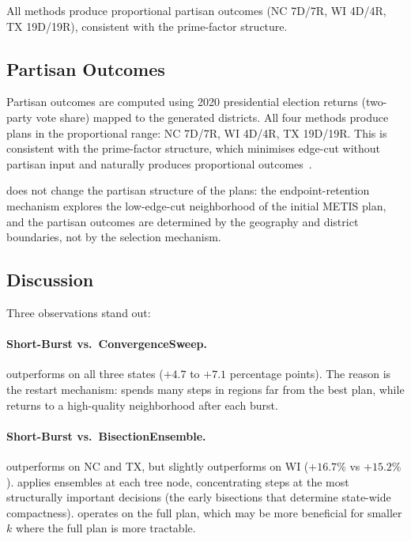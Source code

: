 \noindent All methods produce proportional partisan outcomes (NC 7D/7R,
WI 4D/4R, TX 19D/19R), consistent with the \ar{} prime-factor structure.

\subsection{Partisan Outcomes}

Partisan outcomes are computed using 2020 presidential election returns
(two-party vote share) mapped to the generated districts.
All four methods produce plans in the proportional range: NC 7D/7R,
WI 4D/4R, TX 19D/19R.
This is consistent with the \ar{} prime-factor structure, which
minimises edge-cut without partisan input and naturally produces
proportional outcomes~\citep{b11paper}.

\shb{} does not change the partisan structure of the plans: the
endpoint-retention mechanism explores the low-edge-cut neighborhood
of the initial METIS plan, and the partisan outcomes are determined by
the geography and district boundaries, not by the selection mechanism.

\subsection{Discussion}

Three observations stand out:

\paragraph{Short-Burst vs.\ ConvergenceSweep.}
\shb{} outperforms \cs{} on all three states ($+4.7$ to $+7.1$
percentage points).
The reason is the restart mechanism: \cs{} spends many steps in
regions far from the best plan, while \shb{} returns to a high-quality
neighborhood after each burst.

\paragraph{Short-Burst vs.\ BisectionEnsemble.}
\be{} outperforms \shb{} on NC and TX, but \shb{} slightly outperforms
\be{} on WI ($+16.7\%$ vs $+15.2\%$).
\be{} applies ensembles at each tree node, concentrating steps at
the most structurally important decisions (the early bisections that
determine state-wide compactness).
\shb{} operates on the full plan, which may be more beneficial for
smaller $k$ where the full plan is more tractable.

